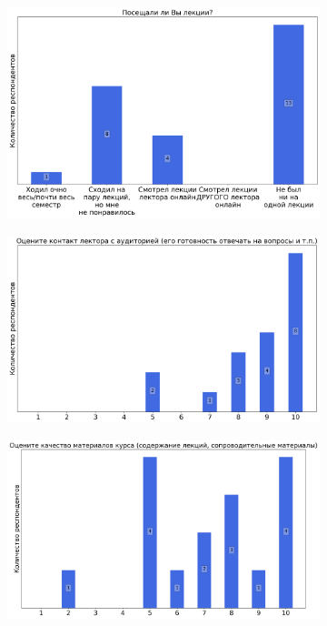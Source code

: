 		\begin{figure}[H]
			\centering
            \begin{subfigure}[b]{0.45\textwidth}
				\centering
				\includegraphics[width=\textwidth]{images/2 course/Компьютерные технологии/lecturer-questions-Ефанов Н.Н.-0.png}
			\end{subfigure}
			\begin{subfigure}[b]{0.45\textwidth}
				\centering
				\includegraphics[width=\textwidth]{images/2 course/Компьютерные технологии/lecturer-marks-Ефанов Н.Н.-0.png}
			\end{subfigure}
			\begin{subfigure}[b]{0.45\textwidth}
				\centering
				\includegraphics[width=\textwidth]{images/2 course/Компьютерные технологии/lecturer-marks-Ефанов Н.Н.-1.png}

\end{subfigure}
\end{figure}
